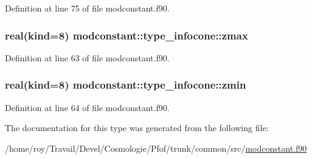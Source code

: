 Definition at line 75 of file modconstant.\+f90.

\subsubsection[{\texorpdfstring{zmax}{zmax}}]{\setlength{\rightskip}{0pt plus 5cm}real(kind=8) modconstant\+::type\+\_\+infocone\+::zmax}\hypertarget{structmodconstant_1_1type__infocone_a77285fcf1f97a7e6a64b020abafdf88c}{}\label{structmodconstant_1_1type__infocone_a77285fcf1f97a7e6a64b020abafdf88c}


Definition at line 63 of file modconstant.\+f90.

\subsubsection[{\texorpdfstring{zmin}{zmin}}]{\setlength{\rightskip}{0pt plus 5cm}real(kind=8) modconstant\+::type\+\_\+infocone\+::zmin}\hypertarget{structmodconstant_1_1type__infocone_a13b7f6b5ba231ea18c19aea9b93f0016}{}\label{structmodconstant_1_1type__infocone_a13b7f6b5ba231ea18c19aea9b93f0016}


Definition at line 64 of file modconstant.\+f90.



The documentation for this type was generated from the following file\+:\begin{DoxyCompactItemize}
\item 
/home/roy/\+Travail/\+Devel/\+Cosmologie/\+Pfof/trunk/common/src/\hyperlink{modconstant_8f90}{modconstant.\+f90}\end{DoxyCompactItemize}
